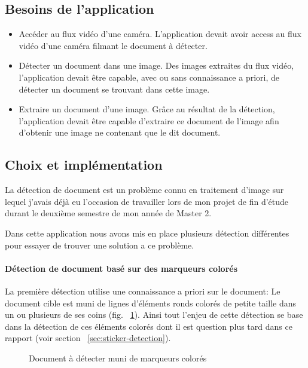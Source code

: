 \subsection{Besoins de l'application}
\label{subsec:doc:content}
\begin{itemize}
\item Accéder au flux vidéo d'une caméra. L'application devait avoir access au flux vidéo d'une caméra filmant le document à détecter.
\item Détecter un document dans une image. Des images extraites du flux vidéo, l'application devait être capable, avec ou sans connaissance a priori, de détecter un document se trouvant dans cette image.
\item Extraire un document d'une image. Grâce au résultat de la détection, l'application devait être capable d'extraire ce document de l'image afin d'obtenir une image ne contenant que le dit document.
\end{itemize}

\subsection{Choix et implémentation}
\label{subsec:doc:impl}

La détection de document est un problème connu en traitement d'image sur lequel j'avais déjà eu l'occasion de travailler lors de mon projet de fin d'étude durant le deuxième semestre de mon année de Master 2.

Dans cette application nous avons mis en place plusieurs détection différentes pour essayer de trouver une solution a ce problème.

\paragraph{Détection de document basé sur des marqueurs colorés} La première détection utilise une connaissance a priori sur le document: Le document cible est muni de lignes d'éléments ronds colorés de petite taille dans un ou plusieurs de ses coins (fig. ~\ref{fig:doc-detection:coloredsticker}). Ainsi tout l'enjeu de cette détection se base dans la détection de ces éléments colorés dont il est question plus tard dans ce rapport (voir section ~\ref{sec:sticker-detection}).

\begin{figure}
\caption{Document à détecter muni de marqueurs colorés}
\label{fig:doc-detection:coloredsticker}
\end{figure}

